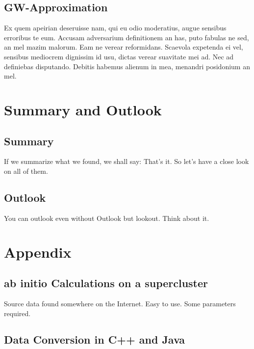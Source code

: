 \documentclass[12pt,oneside,english]{book}
\begin{document}
\section{GW-Approximation}

Ex quem apeirian deseruisse nam, qui eu odio moderatius, augue sensibus erroribus te eum. Accusam adversarium definitionem an has, puto fabulas ne sed, an mel mazim malorum. Eam ne verear reformidans. Scaevola expetenda ei vel, sensibus mediocrem dignissim id usu, dictas verear suavitate mei ad. Nec ad definiebas disputando. Debitis habemus alienum in mea, menandri posidonium an mel.


\chapter{Summary and Outlook}
\section{Summary}

If we summarize what we found, we shall say: That's it. So let's have a close look on all of them.

\section{Outlook}

You can outlook even without Outlook but lookout. Think about it.


\chapter{Appendix}
\section{ab initio Calculations on a supercluster}

Source data found somewhere on the Internet. Easy to use. Some parameters required.

\section{Data Conversion in C++ and Java}
\end{document}
